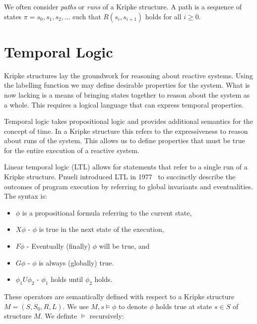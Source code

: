 We often consider \emph{paths} or \emph{runs} of a Kripke structure. A path is
a sequence of states $\pi = s_0, s_1, s_2, ...$ such that $R(s_i, s_{i+1})$
holds for all $i \geq 0$.

\section{Temporal Logic}

Kripke structures lay the groundwork for reasoning about reactive systems.
Using the labelling function we may define desirable properties for the system.
What is now lacking is a means of bringing states together to reason about the
system as a whole. This requires a logical language that can express temporal
properties.

Temporal logic takes propositional logic and provides additional semantics for
the concept of time. In a Kripke structure this refers to the expressiveness to
reason about runs of the system. This allows us to define properties that must
be true for the entire execution of a reactive system.

Linear temporal logic (LTL) allows for statements that refer to a single run of
a Kripke structure. Pnueli introduced LTL in 1977~\cite{Pnueli77} to succinctly
describe the outcomes of program execution by referring to global invariants
and eventualities. The syntax is:

\begin{itemize}
    \item $\phi$ is a propositional formula referring to the current state,
    \item $X\phi$ - $\phi$ is true in the next state of the execution,
    \item $F\phi$ - Eventually (finally) $\phi$ will be true, and
    \item $G\phi$ - $\phi$ is always (globally) true.
    \item $\phi_1 U \phi_2$ - $\phi_1$ holds until $\phi_2$ holds.
\end{itemize}

These operators are semantically defined with respect to a Kripke structure $M
= (S, S_0, R, L)$. We use $M, s \models \phi$ to denote $\phi$ holds true at
state $s \in S$ of structure $M$. We definte $\models$ recursively:

